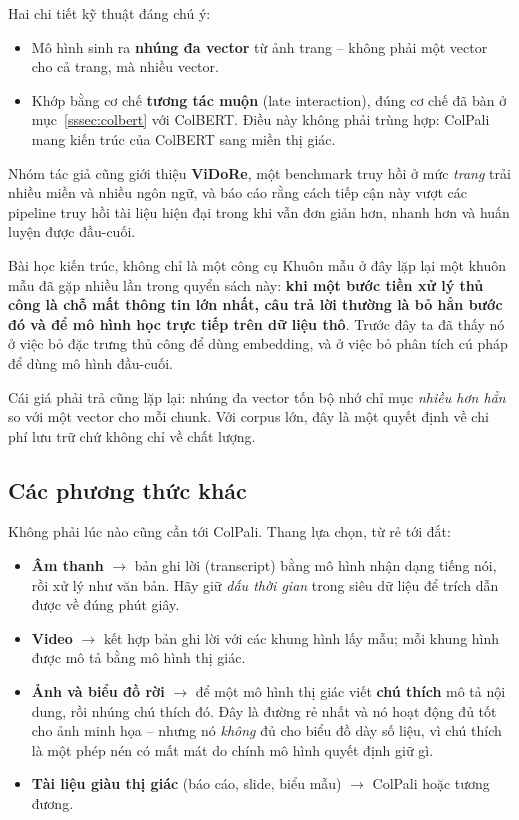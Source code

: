 Hai chi tiết kỹ thuật đáng chú ý:
\begin{itemize}
	\item Mô hình sinh ra \textbf{nhúng đa vector} từ ảnh trang -- không phải một vector cho cả trang, mà nhiều vector.
	\item Khớp bằng cơ chế \textbf{tương tác muộn} (late interaction), đúng cơ chế đã bàn ở mục~\ref{sssec:colbert} với ColBERT. Điều này không phải trùng hợp: ColPali mang kiến trúc của ColBERT sang miền thị giác.
\end{itemize}

Nhóm tác giả cũng giới thiệu \textbf{ViDoRe}, một benchmark truy hồi ở mức \emph{trang} trải nhiều miền và nhiều ngôn ngữ, và báo cáo rằng cách tiếp cận này vượt các pipeline truy hồi tài liệu hiện đại trong khi vẫn đơn giản hơn, nhanh hơn và huấn luyện được đầu-cuối.

\begin{deepdive}{Bài học kiến trúc, không chỉ là một công cụ}
Khuôn mẫu ở đây lặp lại một khuôn mẫu đã gặp nhiều lần trong quyển sách này: \textbf{khi một bước tiền xử lý thủ công là chỗ mất thông tin lớn nhất, câu trả lời thường là bỏ hẳn bước đó và để mô hình học trực tiếp trên dữ liệu thô}. Trước đây ta đã thấy nó ở việc bỏ đặc trưng thủ công để dùng embedding, và ở việc bỏ phân tích cú pháp để dùng mô hình đầu-cuối.

Cái giá phải trả cũng lặp lại: nhúng đa vector tốn bộ nhớ chỉ mục \emph{nhiều hơn hẳn} so với một vector cho mỗi chunk. Với corpus lớn, đây là một quyết định về chi phí lưu trữ chứ không chỉ về chất lượng.
\end{deepdive}

\subsection{Các phương thức khác}
\label{ssec:other_modalities}

Không phải lúc nào cũng cần tới ColPali. Thang lựa chọn, từ rẻ tới đắt:

\begin{itemize}
	\item \textbf{Âm thanh} $\rightarrow$ bản ghi lời (transcript) bằng mô hình nhận dạng tiếng nói, rồi xử lý như văn bản. Hãy giữ \emph{dấu thời gian} trong siêu dữ liệu để trích dẫn được về đúng phút giây.
	\item \textbf{Video} $\rightarrow$ kết hợp bản ghi lời với các khung hình lấy mẫu; mỗi khung hình được mô tả bằng mô hình thị giác.
	\item \textbf{Ảnh và biểu đồ rời} $\rightarrow$ để một mô hình thị giác viết \textbf{chú thích} mô tả nội dung, rồi nhúng chú thích đó. Đây là đường rẻ nhất và nó hoạt động đủ tốt cho ảnh minh họa -- nhưng nó \emph{không} đủ cho biểu đồ dày số liệu, vì chú thích là một phép nén có mất mát do chính mô hình quyết định giữ gì.
	\item \textbf{Tài liệu giàu thị giác} (báo cáo, slide, biểu mẫu) $\rightarrow$ ColPali hoặc tương đương.
\end{itemize}

